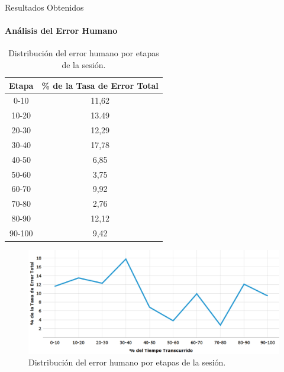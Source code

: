 \begin{frame}{Resultados Obtenidos}
\framesubtitle{An\'alisis del Error Humano}
\begin{table}[H]
\centering
\footnotesize
\begin{tabular}{|c|c|}
\hline
    Etapa & \% de la Tasa de Error Total \\
    \hline
0-10  &  11,62 \\
10-20 &  13.49 \\
20-30 &  12,29 \\
30-40 &  17,78 \\
40-50 &  6,85 \\
50-60 &  3,75 \\
60-70 &  9,92 \\
70-80 &  2,76 \\
80-90 &  12,12 \\
90-100 & 9,42 \\
    \hline
\end{tabular}
\caption{Distribuci\'on del error humano por etapas de la sesi\'on.}
\label{sec:error-tiempo}
\end{table}

\begin{figure}[ht]
\centering
\includegraphics[width=0.8\linewidth]{./graphics/error_tiempo.png}
\caption{Distribuci\'on del error humano por etapas de la sesi\'on.}
\label{figure:gerror-tiempo}
\end{figure}


\end{frame}

